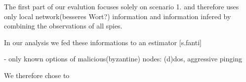 
The first part of our evalution focuses solely on scenario 1. and therefore uses only local
network(besseres Wort?) information and information infered by combining the observations of all spies.


In our analysis we fed these informations to an estimator [s.fanti]

- only known options of malicious(byzantine) nodes: (d)dos, aggressive pinging

We therefore chose to 


